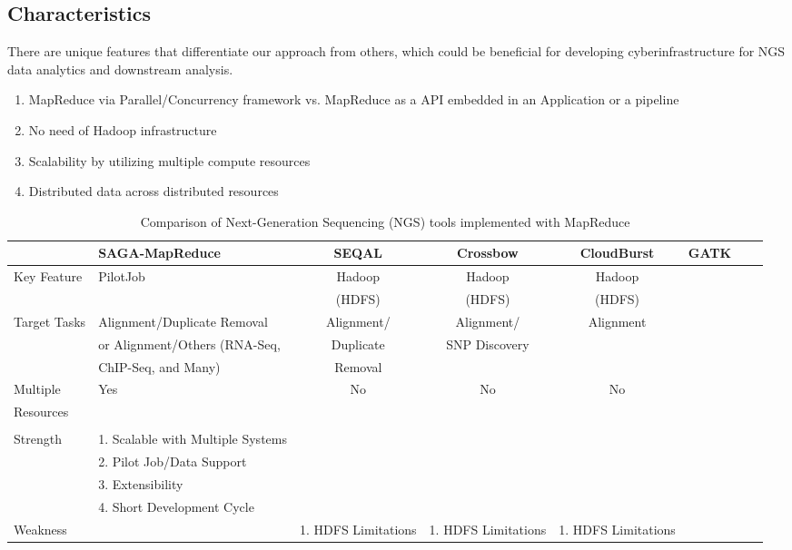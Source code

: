 \documentclass{sig-alternate}
\begin{document}
\subsection{Characteristics}

There are unique features that differentiate our approach from others, which could be beneficial for developing cyberinfrastructure for NGS data analytics and downstream analysis.  
\begin{enumerate}

\item MapReduce via Parallel/Concurrency framework vs. MapReduce as a API embedded in an Application or a pipeline  
\item No need of Hadoop infrastructure
\item Scalability by utilizing multiple compute resources
\item Distributed data across distributed resources
\end{enumerate}
 
 

\begin{center}
\begin{table}[ht]
{\small
\hfill{}
\begin{tabular}{|l|l|c|c|c|c|c|c|}
\hline
  & \textbf{SAGA-MapReduce}\cite{pj_sagamr} & \textbf{SEQAL}\cite{seal2011} & \textbf{Crossbow}\cite{langmead2009} & \textbf{CloudBurst}\cite{cloudburst} & \textbf{GATK}\cite{gatk} \\ \hline
 \hline 
 Key Feature & PilotJob   &  Hadoop  &  Hadoop & Hadoop & \\ 
  &   & (HDFS)  &  (HDFS) & (HDFS) & \\ \hline
Target Tasks & Alignment/Duplicate Removal & Alignment/ & Alignment/ & Alignment & \\
       &  or Alignment/Others (RNA-Seq, & Duplicate & SNP Discovery & & \\ 
        & ChIP-Seq, and Many) &  Removal & &  & \\ \hline  
Multiple  & Yes  & No  & No & No  &\\
Resources   & &  &   &  &\\  &  &  &  &  & \\ \hline

Strength & 1. Scalable with Multiple Systems  &  &  &  & \\ 

&  2. Pilot Job/Data Support & &  & & \\ 
&3. Extensibility  &  &  &  & \\
& 4. Short Development Cycle & & & & \\\hline
Weakness &  & 1. HDFS Limitations & 1. HDFS Limitations & 1. HDFS Limitations  &\\ \hline

\hline
\end{tabular}}
\hfill{}
\caption{Comparison of Next-Generation Sequencing (NGS) tools implemented with MapReduce}
 \label{table:mr-comparison}
\end{table}
\end{center}
\end{document}
